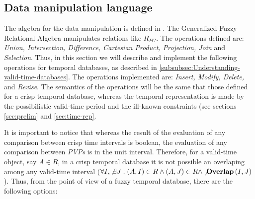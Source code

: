 \subsection{\label{subsec:data-manipulation}Data manipulation language}

The algebra for the data manipulation is defined in \cite{Medina1994}. The Generalized Fuzzy Relational Algebra manipulates relations like $R_{FG}$. The operations defined are: \emph{Union, Intersection, Difference, Cartesian Product, Projection, Join} and \emph{Selection}. Thus, in this section we will describe and implement the following operations for temporal databases, as described in \ref{subsubsec:Understanding-valid-time-databases}. The operations implemented are: \emph{Insert, Modify, Delete, } and \emph{Revise}. The semantics of the operations will be the same that those defined for a crisp temporal database, whereas the temporal representation is made by the possibilistic valid-time period and the ill-known constraints (see sections \ref{sec:prelim} and \ref{sec:time-rep}.

It is important to notice that whereas the result of the evaluation of any comparison between crisp time intervals is boolean, the evaluation of any comparison between \emph{PVPs} is in the unit interval.  Therefore, for a valid-time object, say $A \in R$, in a crisp temporal database it is not possible an overlaping among any valid-time interval ($\forall I, \not \exists J: \left(A, I \right) \in R \wedge \left(A, J \right) \in R \wedge \not \mbox{\textbf{Overlap}}\left(I, J \right)$). Thus, from the point of view of a fuzzy temporal database, there are the following options:

